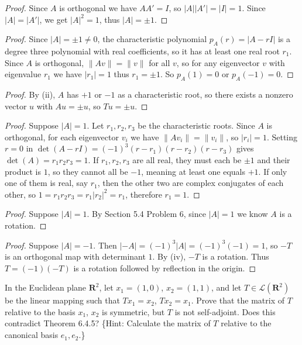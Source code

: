 \begin{proof}
    Since $A$ is orthogonal we have $AA' = I$,
    so $|A||A'| = |I| = 1$. Since $|A| = |A'|$, we get $|A|^2 = 1$,
    thus $|A| = \pm 1$.
\end{proof}

\begin{proof}
    Since $|A| = \pm 1 \neq 0$, the characteristic polynomial $p_A(r) = |A - rI|$
    is a degree three polynomial with real coefficients, so it has at least one real root $r_1$.
    Since $A$ is orthogonal, $\|Av\| = \|v\|$ for all $v$, so for any eigenvector $v$ with eigenvalue $r_1$
    we have $|r_1| = 1$ thus $r_1 = \pm 1$.
    So $p_A(1) = 0$ or $p_A(-1) = 0$.
\end{proof}

\begin{proof}
    By (ii), $A$ has $+1$ or $-1$ as a characteristic root, so there exists a nonzero vector $u$
    with $Au = \pm u$, so  $Tu = \pm u$.
\end{proof}

\begin{proof}
    Suppose $|A| = 1$.
    Let $r_1, r_2, r_3$ be the characteristic roots.
    Since $A$ is orthogonal, for each eigenvector $v_i$ we have $\|Av_i\| = \|v_i\|$,
    so $|r_i| = 1$.
    Setting $r = 0$ in $\det(A - rI) = (-1)^3(r - r_1)(r - r_2)(r - r_3)$ gives
    $\det(A) = r_1 r_2 r_3 = 1$.
    If $r_1, r_2, r_3$ are all real, they must each be $\pm 1$ and their product is $1$,
    so they cannot all be $-1$, meaning at least one equals $+1$.
    If only one of them is real, say $r_1$, then the other two are complex conjugates
    of each other, so $1 = r_1 r_2 r_3 = r_1 |r_2|^2 = r_1$, therefore $r_1 = 1$.
\end{proof}

\begin{proof}
    Suppose $|A| = 1$.
    By Section 5.4 Problem 6, since $|A| = 1$ we know $A$ is a rotation.
\end{proof}

\begin{proof}
    Suppose $|A| = -1$.
    Then $|-A| = (-1)^3|A| = (-1)^3(-1) = 1$,
    so $-T$ is an orthogonal map with determinant $1$. By (iv), $-T$ is a rotation.
    Thus $T = (-1)(-T)$ is a rotation followed by reflection in the origin.
\end{proof}


\begin{tcolorbox}[title=Problem 9, breakable]
In the Euclidean plane $\mathbf{R}^2$, let $x_1 = (1,0)$, $x_2 = (1,1)$, 
and let $T \in \mathcal{L}(\mathbf{R}^2)$ be the linear mapping such 
that $Tx_1 = x_2$, $Tx_2 = x_1$. Prove that the matrix of $T$ relative 
to the basis $x_1$, $x_2$ is symmetric, but $T$ is not self-adjoint. 
Does this contradict Theorem 6.4.5? \{Hint: Calculate the matrix of $T$ relative to the canonical basis $e_1, e_2$.\}
\end{tcolorbox}

